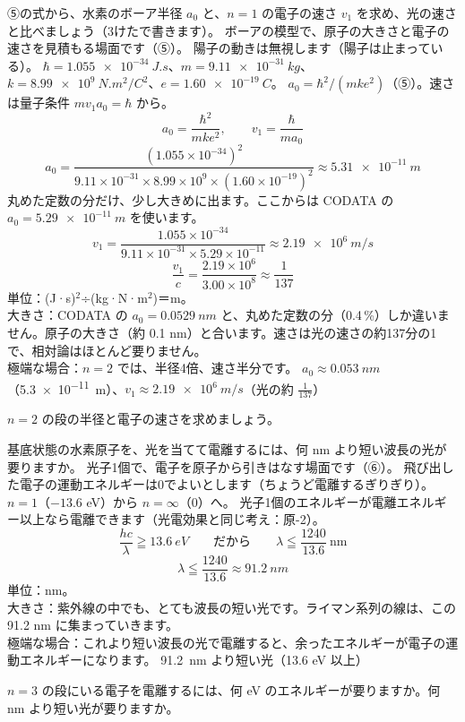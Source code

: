 \label{ph:原-4:ex5}
\begin{phreidai}[ボーア半径と電子の速さ]
⑤の式から、水素のボーア半径 $a_0$ と、$n=1$ の電子の速さ $v_1$ を求め、光の速さと比べましょう（3けたで書きます）。
\phbamen
ボーアの模型で、原子の大きさと電子の速さを見積もる場面です（⑤）。
\phmushi
陽子の動きは無視します（陽子は止まっている）。
\phzu
$\hbar=\qty{1.055e-34}{J.s}$、$m=\qty{9.11e-31}{kg}$、\\
$k=\qty{8.99e9}{N.m^2/C^2}$、$e=\qty{1.60e-19}{C}$。
\phriyu
$a_0=\hbar^2/(mke^2)$（⑤）。速さは量子条件 $mv_1a_0=\hbar$ から。
\phtateru
\[ a_0=\frac{\hbar^2}{mke^2},\qquad v_1=\frac{\hbar}{ma_0} \]
\phtoku
\[ a_0=\frac{(1.055\times10^{-34})^2}{9.11\times10^{-31}\times8.99\times10^{9}\times(1.60\times10^{-19})^2}\approx\qty{5.31e-11}{m} \]
丸めた定数の分だけ、少し大きめに出ます。ここからは CODATA の $a_0=\qty{5.29e-11}{m}$ を使います。
\[ v_1=\frac{1.055\times10^{-34}}{9.11\times10^{-31}\times5.29\times10^{-11}}\approx\qty{2.19e6}{m/s} \]
\[ \frac{v_1}{c}=\frac{2.19\times10^6}{3.00\times10^8}\approx\frac{1}{137} \]
\phtashikame
単位：(J·s)$^2$÷(kg·N·m$^2$)＝m。\\
大きさ：CODATA の $a_0=\qty{0.0529}{nm}$ と、丸めた定数の分（0.4\,\%）しか違いません。原子の大きさ（約 0.1 nm）と合います。速さは光の速さの約137分の1で、相対論はほとんど要りません。\\
極端な場合：$n=2$ では、半径4倍、速さ半分です。
\kotae $a_0\approx\qty{0.053}{nm}$（\qty{5.3e-11}{m}）、$v_1\approx\qty{2.19e6}{m/s}$（光の約 $\tfrac{1}{137}$）
\end{phreidai}
\begin{jibun}
$n=2$ の段の半径と電子の速さを求めましょう。
\end{jibun}

\label{ph:原-4:ex6}
\begin{phreidai}[水素を電離する光]
基底状態の水素原子を、光を当てて電離するには、何 nm より短い波長の光が要りますか。
\phbamen
光子1個で、電子を原子から引きはなす場面です（⑥）。
\phmushi
飛び出した電子の運動エネルギーは0でよいとします（ちょうど電離するぎりぎり）。
\phzu
$n=1$（$-13.6$ eV）から $n=\infty$（0）へ。
\phriyu
光子1個のエネルギーが電離エネルギー以上なら電離できます（光電効果と同じ考え：原-2）。
\phtateru
\[ \frac{hc}{\lambda}\geqq\qty{13.6}{eV}\qquad\text{だから}\qquad\lambda\leqq\frac{1240}{13.6}\ \mathrm{nm} \]
\phtoku
\[ \lambda\leqq\frac{1240}{13.6}\approx\qty{91.2}{nm} \]
\phtashikame
単位：nm。\\
大きさ：紫外線の中でも、とても波長の短い光です。ライマン系列の線は、この 91.2 nm に集まっていきます。\\
極端な場合：これより短い波長の光で電離すると、余ったエネルギーが電子の運動エネルギーになります。
\kotae \qty{91.2}{nm} より短い光（13.6 eV 以上）
\end{phreidai}
\begin{jibun}
$n=3$ の段にいる電子を電離するには、何 eV のエネルギーが要りますか。何 nm より短い光が要りますか。
\end{jibun}

